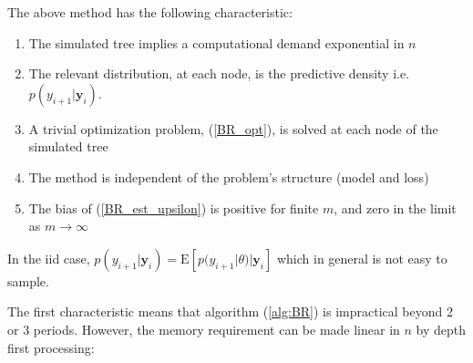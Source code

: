 \documentclass{article}
\begin{document}
The above method has the following characteristic:
\begin{enumerate}
\item The simulated tree implies a computational demand exponential in $n$
\item The relevant distribution, at each node, is the predictive
density i.e. $p(y_{i+1}|\mathbf{y}_{i})$.
\item A trivial optimization problem, (\ref{BR_opt}), is solved at each node of the
simulated tree
\item The method is independent of the problem's structure (model and loss)
\item The bias of (\ref{BR_est_upsilon}) is positive for finite $m$,
and zero in the limit as $m\rightarrow \infty$
\end{enumerate}In the iid case,
$p(y_{i+1}|\mathbf{y}_{i})=\mathrm{E}[p(y_{i+1}|\theta)|\mathbf{y}_{i}]$
which in general is not easy to sample.

The first characteristic means that algorithm (\ref{alg:BR}) is
impractical beyond 2 or 3 periods. However, the memory requirement
can be made linear in $n$ by depth first processing:
\end{document}
